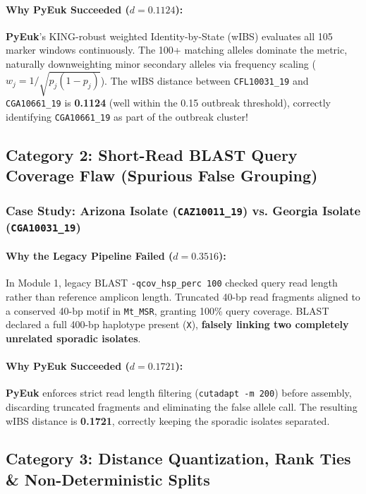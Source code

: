 \documentclass[11pt,a4paper]{article}
\begin{document}
\paragraph{Why PyEuk Succeeded ($d = 0.1124$):}
\textbf{PyEuk}'s KING-robust weighted Identity-by-State (wIBS) evaluates all 105 marker windows continuously. The 100+ matching alleles dominate the metric, naturally downweighting minor secondary alleles via frequency scaling ($w_j = 1/\sqrt{p_j(1-p_j)}$). The wIBS distance between \texttt{CFL10031\_19} and \texttt{CGA10661\_19} is \textbf{0.1124} (well within the 0.15 outbreak threshold), correctly identifying \texttt{CGA10661\_19} as part of the outbreak cluster!

\subsection{Category 2: Short-Read BLAST Query Coverage Flaw (Spurious False Grouping)}

\subsubsection{Case Study: Arizona Isolate (\texttt{CAZ10011\_19}) vs. Georgia Isolate (\texttt{CGA10031\_19})}
\paragraph{Why the Legacy Pipeline Failed ($d = 0.3516$):}
In Module 1, legacy BLAST \texttt{-qcov\_hsp\_perc 100} checked query read length rather than reference amplicon length. Truncated 40-bp read fragments aligned to a conserved 40-bp motif in \texttt{Mt\_MSR}, granting 100\% query coverage. BLAST declared a full 400-bp haplotype present (\texttt{X}), \textbf{falsely linking two completely unrelated sporadic isolates}.

\paragraph{Why PyEuk Succeeded ($d = 0.1721$):}
\textbf{PyEuk} enforces strict read length filtering (\texttt{cutadapt -m 200}) before assembly, discarding truncated fragments and eliminating the false allele call. The resulting wIBS distance is \textbf{0.1721}, correctly keeping the sporadic isolates separated.

\subsection{Category 3: Distance Quantization, Rank Ties \& Non-Deterministic Splits}
\end{document}
